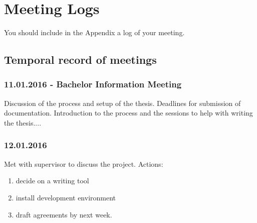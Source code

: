 \chapter{Meeting Logs}
You should include in the Appendix a log of your meeting.
\section{Temporal record of meetings}
\subsection*{11.01.2016 - Bachelor Information Meeting}
Discussion of the process and setup of the thesis.  Deadlines for submission of documentation.  Introduction to the process and the sessions to help with writing the thesis....

\subsection*{12.01.2016}
Met with supervisor to discuss the project. Actions:
\begin{enumerate}
	\item decide on a writing tool
	\item install development environment
	\item draft agreements by next week.
\end{enumerate}


